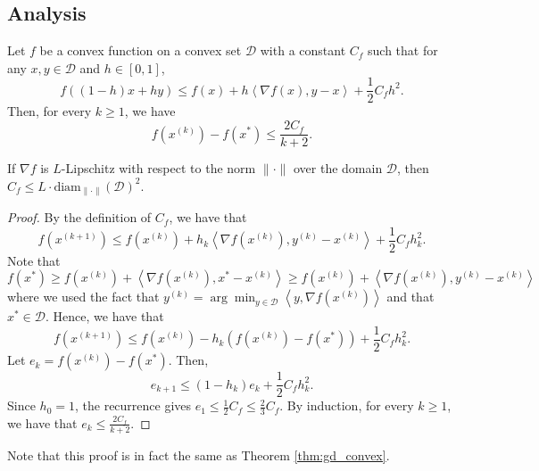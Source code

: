 \subsection*{Analysis}
\begin{thm}
Let $f$ be a convex function on a convex set $\mathcal{D}$ with
a constant $C_{f}$ such that for any $x,y\in\mathcal{D}$ and $h\in[0,1]$,
\[
f((1-h)x+hy)\leq f(x)+h\left\langle \nabla f(x),y-x\right\rangle +\frac{1}{2}C_{f}h^{2}.
\]
Then, for every $k\ge1$, we have
\[
f(x^{(k)})-f(x^{*})\leq\frac{2C_{f}}{k+2}.
\]
\end{thm}

\begin{rem*}
If $\nabla f$ is $L$-Lipschitz with respect to the norm $\|\cdot\|$
over the domain $\mathcal{D}$, then $C_{f}\leq L\cdot\text{diam}_{\|\cdot\|}(\mathcal{D})^{2}.$
\end{rem*}
\begin{proof}
By the definition of $C_{f}$, we have that
\[
f(x^{(k+1)})\leq f(x^{(k)})+h_{k}\left\langle \nabla f(x^{(k)}),y^{(k)}-x^{(k)}\right\rangle +\frac{1}{2}C_{f}h^{2}_{k}.
\]
Note that 
\[
f(x^{*})\geq f(x^{(k)})+\left\langle \nabla f(x^{(k)}),x^{*}-x^{(k)}\right\rangle \geq f(x^{(k)})+\left\langle \nabla f(x^{(k)}),y^{(k)}-x^{(k)}\right\rangle 
\]
where we used the fact that $y^{(k)}=\arg\min_{y\in\mathcal{D}}\left\langle y,\nabla f(x^{(k)})\right\rangle $
and that $x^{*}\in\mathcal{D}$. Hence, we have that
\[
f(x^{(k+1)})\leq f(x^{(k)})-h_{k}(f(x^{(k)})-f(x^{*}))+\frac{1}{2}C_{f}h^{2}_{k}.
\]
Let $e_{k}=f(x^{(k)})-f(x^{*})$. Then, 
\[
e_{k+1}\leq(1-h_{k})e_{k}+\frac{1}{2}C_{f}h^{2}_{k}.
\]
Since $h_{0}=1$, the recurrence gives $e_{1}\leq\frac{1}{2}C_{f}\leq\frac{2}{3}C_{f}$.
By induction, for every $k\ge1$, we have that $e_{k}\leq\frac{2C_{f}}{k+2}$.
\end{proof}
\begin{rem*}
Note that this proof is in fact the same as Theorem \ref{thm:gd_convex}.

\end{rem*}

